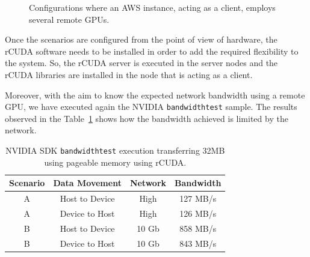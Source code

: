 \documentclass[a4paper,twoside]{article}
\begin{document}
\begin{figure}[ht]
\centering
{}
\quad
{}
\caption{Configurations where an AWS instance, acting as a client, employs several remote GPUs.}
\label{fig:aws}
\end{figure}

Once the scenarios are configured from the point of view of hardware, 
the {rCUDA} software needs to be installed in order to add 
the required flexibility to the system. So, the {rCUDA} server is 
executed in the server nodes and the {rCUDA} libraries are installed 
in the node that is acting as a client.

Moreover, with the aim to know the expected network bandwidth using 
a remote GPU, we have executed again the NVIDIA {\tt bandwidthtest} sample.
The results observed in the Table~\ref{table:bwtrcuda} shows how the bandwidth achieved is limited 
by the network.

\begin{table}[htb]
\renewcommand{\arraystretch}{1.3}
\caption{NVIDIA SDK {\tt bandwidthtest} execution transferring 32MB using pageable memory using {rCUDA}.}
\label{table:bwtrcuda}
\tabcolsep=0.09cm
\begin{center}\begin{tabular}{cccc}
Scenario &  Data Movement & Network & Bandwidth \\ \hline \hline
A & Host to Device & High& 127 MB/s \\ \hline
A & Device to Host & High& 126 MB/s\\ \hline
B & Host to Device & 10 Gb& 858 MB/s\\ \hline
B & Device to Host & 10 Gb& 843 MB/s\\ \hline
\end{tabular}\end{center}\end{table}
\end{document}
